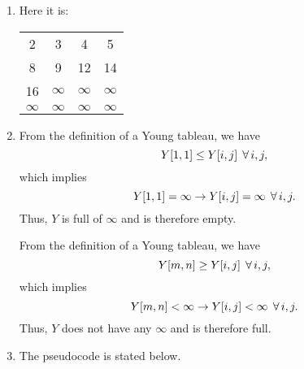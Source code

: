 \begin{enumerate}
\begin{framed}
\begin{enumerate}
\item Here it is:

\begin{center}
\begin{tabular}{cccc}
  2 & 3 & 4 & 5\\
  8 & 9 & 12 & 14\\
  16 & $\infty$ & $\infty$ & $\infty$\\
  $\infty$ & $\infty$ & $\infty$ & $\infty$
\end{tabular}
\end{center}

\item From the definition of a Young tableau, we have
\[
  Y[1, 1] \le Y[i, j]\;\operatorname{\forall} i, j,
\]
which implies
\[
  Y[1, 1] = \infty \rightarrow Y[i, j] = \infty\;\operatorname{\forall} i, j.
\]
Thus, $Y$ is full of $\infty$ and is therefore empty.

From the definition of a Young tableau, we have
\[
  Y[m, n] \ge Y[i, j]\;\operatorname{\forall} i, j,
\]
which implies
\[
  Y[m, n] < \infty \rightarrow Y[i, j] < \infty\;\operatorname{\forall} i, j.
\]
Thus, $Y$ does not have any $\infty$ and is therefore full.

\item The pseudocode is stated below.

\begin{algorithm}[H]
\SetAlgoNoEnd\DontPrintSemicolon
\BlankLine
{}
\end{algorithm}

\begin{algorithm}[H]
\SetAlgoNoEnd\DontPrintSemicolon
\BlankLine
{}
\end{algorithm}


\end{enumerate}
\end{framed}
\end{enumerate}
